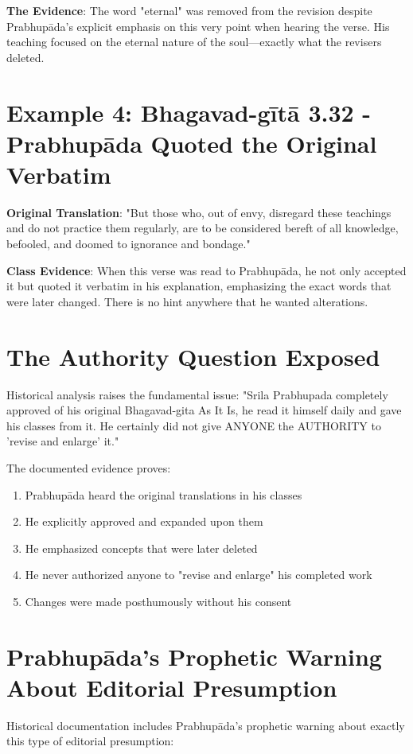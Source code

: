 \documentclass[11pt,twoside]{book}
\begin{document}
\textbf{\textbf{The Evidence}}: The word "eternal" was removed from the revision despite Prabhupāda's explicit emphasis on this very point when hearing the verse. His teaching focused on the eternal nature of the soul—exactly what the revisers deleted.
\section*{Example 4: Bhagavad-gītā 3.32 - Prabhupāda Quoted the Original Verbatim}
\label{sec:orgba7983b}

\textbf{\textbf{Original Translation}}: "But those who, out of envy, disregard these teachings and do not practice them regularly, are to be considered bereft of all knowledge, befooled, and doomed to ignorance and bondage."

\textbf{\textbf{Class Evidence}}: When this verse was read to Prabhupāda, he not only accepted it but quoted it verbatim in his explanation, emphasizing the exact words that were later changed. There is no hint anywhere that he wanted alterations.
\section*{The Authority Question Exposed}
\label{sec:org12cff12}

Historical analysis raises the fundamental issue: "Srila Prabhupada completely approved of his original Bhagavad-gita As It Is, he read it himself daily and gave his classes from it. He certainly did not give ANYONE the AUTHORITY to 'revise and enlarge' it."

The documented evidence proves:
\begin{enumerate}
\item Prabhupāda heard the original translations in his classes
\item He explicitly approved and expanded upon them
\item He emphasized concepts that were later deleted
\item He never authorized anyone to "revise and enlarge" his completed work
\item Changes were made posthumously without his consent
\end{enumerate}
\section*{Prabhupāda's Prophetic Warning About Editorial Presumption}
\label{sec:orgff16289}

Historical documentation includes Prabhupāda's prophetic warning about exactly this type of editorial presumption:
\end{document}
